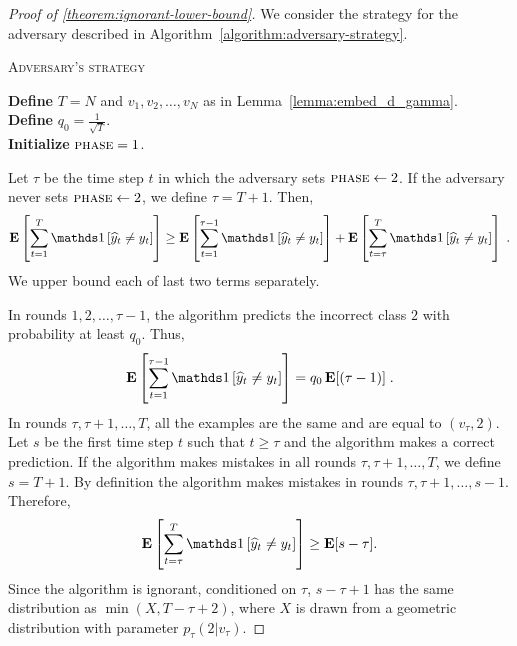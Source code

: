 \begin{proof}[Proof of \autoref{theorem:ignorant-lower-bound}]
We consider the strategy for the adversary described in
Algorithm~\ref{algorithm:adversary-strategy}.

\begin{algorithm}
\caption{\textsc{Adversary's strategy}}
\label{algorithm:adversary-strategy}
\textbf{Define} $T=N$ and $v_1, v_2, \dots, v_N$ as in Lemma~\ref{lemma:embed_d_gamma}.\\
\textbf{Define} $q_0=\frac{1}{\sqrt{T}}$. \\
\textbf{Initialize} $\textsc{phase}= 1$. \\
\end{algorithm}

Let $\tau$ be the time step $t$ in which the adversary sets $\textsc{phase}\leftarrow 2$.
If the adversary never sets $\textsc{phase}\leftarrow 2$, we define $\tau = T + 1$.
Then,
\begin{align*}
 \Exp \left[\sum_{t=1}^T \indicator{\widehat y_t\neq y_t}\right]
 \ge \Exp\left[\sum_{t=1}^{\tau - 1} \indicator{\widehat y_t\neq y_t}\right]
+ \Exp\left[\sum_{t=\tau}^T \indicator{\widehat y_t\neq y_t}\right] \; .
\end{align*}
We upper bound each of last two terms separately.

In rounds $1,2,\dots,\tau-1$, the algorithm predicts the incorrect class $2$
with probability at least $q_0$. Thus,
$$
\Exp\left[\sum_{t=1}^{\tau - 1} \indicator{\widehat y_t\neq y_t}\right] = q_0 \Exp[(\tau - 1)] \; .
$$
In rounds $\tau, \tau+1, \dots, T$, all the examples are the same and are equal
to $(v_\tau, 2)$. Let $s$ be the first time step $t$ such that $t \ge \tau$
and the algorithm makes a correct prediction. If the algorithm makes mistakes
in all rounds $\tau, \tau+1, \dots, T$, we define $s = T+1$.
By definition the algorithm makes mistakes in rounds $\tau, \tau+1, \dots, s-1$.
Therefore,
$$
\Exp\left[\sum_{t=\tau}^T \indicator{\widehat y_t\neq y_t}\right] \ge \Exp[s-\tau].
$$
Since the algorithm is ignorant, conditioned on $\tau$, $s-\tau+1$ has the same distribution as
$\min(X, T-\tau+2)$, where $X$ is drawn from a geometric distribution with parameter
$p_\tau(2|v_\tau)$.


\end{proof}
